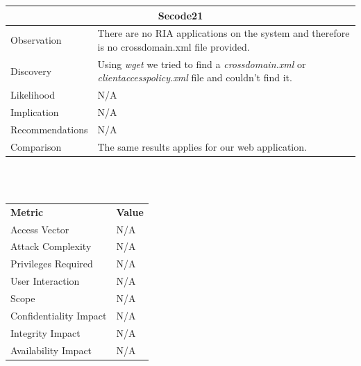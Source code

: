 \documentclass[headsepline,footsepline,footinclude=false,oneside,fontsize=11pt,paper=a4,listof=totoc,bibliography=totoc]{scrbook} %
\begin{document}
\begin{tabular}{ l|p{11cm}  }
	\hline
	\multicolumn{2}{c}{\textbf{Secode21}} \\ 
	\hline
	Observation   & There are no RIA applications on the system and therefore is no crossdomain.xml file provided. \\
	Discovery  & Using \textit{wget} we tried to find a \textit{crossdomain.xml} or \textit{clientaccesspolicy.xml} file and couldn't find it. \\
	Likelihood & N/A \\
	Implication    & N/A \\
	Recommendations & N/A \\
	Comparison & The same results applies for our web application. \\  
	\hline
\end{tabular}
\\
\vspace{0.5cm}
\\
\begin{center}
	\begin{tabular}{ll}
		\rowcolor[HTML]{34CDF9} 
		{\color[HTML]{ECF4FF} \textbf{Metric}}        & {\color[HTML]{ECF4FF} \textbf{Value}} \\
		\rowcolor[HTML]{BBDAFF} 
		{\color[HTML]{333333} Access Vector}          & {\color[HTML]{333333} } N/A              \\
		\rowcolor[HTML]{ECF4FF} 
		{\color[HTML]{333333} Attack Complexity}      & {\color[HTML]{333333} } N/A              \\
		\rowcolor[HTML]{BBDAFF} 
		{\color[HTML]{333333} Privileges Required}    & {\color[HTML]{333333} } N/A              \\
		\rowcolor[HTML]{ECF4FF} 
		{\color[HTML]{333333} User Interaction}       & {\color[HTML]{333333} } N/A              \\
		\rowcolor[HTML]{BBDAFF} 
		{\color[HTML]{333333} Scope}                  & {\color[HTML]{333333} } N/A              \\
		\rowcolor[HTML]{ECF4FF} 
		{\color[HTML]{333333} Confidentiality Impact} & {\color[HTML]{333333} } N/A              \\
		\rowcolor[HTML]{BBDAFF} 
		{\color[HTML]{333333} Integrity Impact}       & {\color[HTML]{333333} } N/A              \\
		\rowcolor[HTML]{ECF4FF} 
		{\color[HTML]{333333} Availability Impact}    & {\color[HTML]{333333} } N/A             
	\end{tabular}
\end{center}
\pagebreak 
\end{document}
